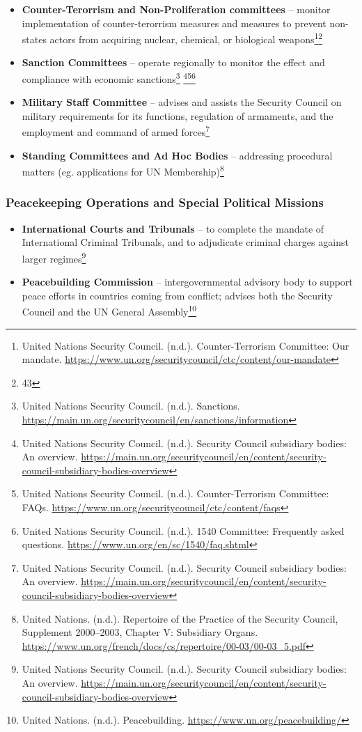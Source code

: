 \begin{itemize}
  \item \textbf{Counter-Terorrism and Non-Proliferation committees} -- monitor implementation of counter-terorrism measures and measures to prevent non-states actors from acquiring nuclear, chemical, or biological weapons\footnote{United Nations Security Council. (n.d.). Counter-Terrorism Committee: Our mandate. \url{https://www.un.org/securitycouncil/ctc/content/our-mandate}}\footnote{43}
  \item \textbf{Sanction Committees} -- operate regionally to monitor the effect and compliance with economic sanctions\footnote{United Nations Security Council. (n.d.). Sanctions. \url{https://main.un.org/securitycouncil/en/sanctions/information}} \footnote{United Nations Security Council. (n.d.). Security Council subsidiary bodies: An overview. \url{https://main.un.org/securitycouncil/en/content/security-council-subsidiary-bodies-overview}}\footnote{United Nations Security Council. (n.d.). Counter-Terrorism Committee: FAQs. \url{https://www.un.org/securitycouncil/ctc/content/faqs}}\footnote{United Nations Security Council. (n.d.). 1540 Committee: Frequently asked questions. \url{https://www.un.org/en/sc/1540/faq.shtml}}
  \item \textbf{Military Staff Committee} -- advises and assists the Security Council on military requirements for its functions, regulation of armaments, and the employment and command of armed forces\footnote{United Nations Security Council. (n.d.). Security Council subsidiary bodies: An overview. \url{https://main.un.org/securitycouncil/en/content/security-council-subsidiary-bodies-overview}}
  \item \textbf{Standing Committees and Ad Hoc Bodies} -- addressing procedural matters (eg. applications for UN Membership)\footnote{United Nations. (n.d.). Repertoire of the Practice of the Security Council, Supplement 2000–2003, Chapter V: Subsidiary Organs. \url{https://www.un.org/french/docs/cs/repertoire/00-03/00-03_5.pdf}}
\end{itemize}

\subsubsection{Peacekeeping Operations and Special Political Missions}

\begin{itemize}
  \item \textbf{International Courts and Tribunals} -- to complete the mandate of International Criminal Tribunals, and to adjudicate criminal charges against larger regimes\footnote{United Nations Security Council. (n.d.). Security Council subsidiary bodies: An overview. \url{https://main.un.org/securitycouncil/en/content/security-council-subsidiary-bodies-overview}}
  \item \textbf{Peacebuilding Commission} -- intergovernmental advisory body to support peace efforts in countries coming from conflict; advises both the Security Council and the UN General Assembly\footnote{United Nations. (n.d.). Peacebuilding. \url{https://www.un.org/peacebuilding/}}
\end{itemize}
